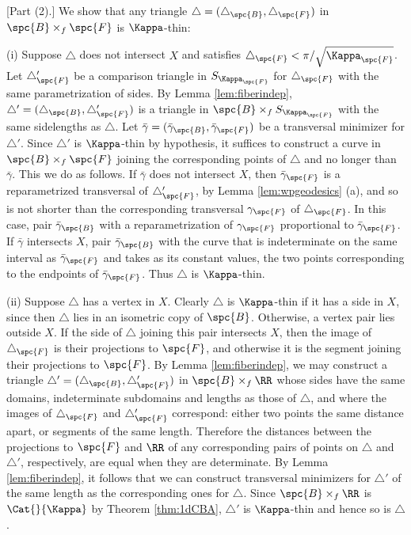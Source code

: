 [Part (2).] We show that any triangle
$\triangle=(\triangle_\spc{B},\triangle_\spc{F})$ in
$\spc{B}\times_f\spc{F}$ is $\Kappa$-thin:

(i)  Suppose $\triangle$ does not
intersect $X$ and satisfies $
\triangle_\spc{F}<\pi/\sqrt{\Kappa_\spc{F}}$.  Let $\triangle_\spc{F}'$ be a comparison
triangle in $S_{\Kappa_\spc{F}}$ for
$\triangle_\spc{F}$ with the same parametrization of sides.  By Lemma
\ref{lem:fiberindep}, $\triangle' =
(\triangle_\spc{B},\triangle_\spc{F}')$ is a triangle in $\spc{B}\times_fS_{\Kappa_\spc{F}}$ with the same
sidelengths as $\triangle$.   Let $\bar\gamma=(\bar\gamma_\spc{B},\bar\gamma_\spc{F})$ be a
transversal minimizer for
$\triangle'$.  Since $\triangle'$ is $\Kappa$-thin by hypothesis, it
suffices to construct a curve  in  $\spc{B}\times_f\spc{F}$ joining the
corresponding points
of $\triangle$ and no longer than $\bar\gamma$.  This we do as
follows.  If $\bar\gamma$ does not intersect $X$, then $\bar\gamma_\spc{F}$
is a reparametrized transversal of $\triangle_\spc{F}'$, by Lemma
\ref{lem:wpgeodesics} (a), and so is not shorter than the
corresponding transversal $\gamma_\spc{F}$ of $\triangle_\spc{F}$.  In this case,
pair $\bar\gamma_\spc{B}$ with a
reparametrization of $\gamma_\spc{F}$ proportional to $\bar\gamma_\spc{F}$.
If $\bar\gamma$ intersects $X$, pair $\bar\gamma_\spc{B}$ with the curve
that is indeterminate on the
same interval as $\bar\gamma_\spc{F}$ and takes as its constant values, the
two points
corresponding to the endpoints of $\bar\gamma_\spc{F}$.  Thus $\triangle$
is $\Kappa$-thin.

(ii)  Suppose $\triangle$ has a vertex
in $X$. Clearly $\triangle$ is $\Kappa$-thin if it has a side in $X$,
since then $\triangle$ lies in an isometric copy of $\spc{B}$.  Otherwise,
a vertex pair lies outside $X$.  If the side of $\triangle$  joining
this pair intersects $X$, then the image of $\triangle_\spc{F}$ is their
projections to $\spc{F}$, and otherwise it is the segment joining their
projections to $\spc{F}$.  By Lemma \ref{lem:fiberindep}, we may construct
a triangle $\triangle' = (\triangle_\spc{B},\triangle_\spc{F}')$ in $\spc{B}\times_f\RR$
whose sides have  the same domains, indeterminate subdomains and
lengths as those of $\triangle$, and where the images of
$\triangle_\spc{F}$ and $\triangle_\spc{F}'$ correspond:   either two points the
same distance apart, or segments of the same length.  Therefore the
distances between the projections to $\spc{F}$ and $\RR$ of any
corresponding pairs of points on $\triangle$ and $\triangle'$,
respectively, are equal when they are determinate.  By Lemma
\ref{lem:fiberindep}, it follows that we can construct transversal
minimizers for $\triangle'$ of the same length as the corresponding
ones for $\triangle$.  Since $\spc{B}\times_f\RR$ is $\Cat{}{\Kappa}$ by Theorem
\ref{thm:1dCBA}, $\triangle'$ is $\Kappa$-thin  and  hence so is $\triangle$.

